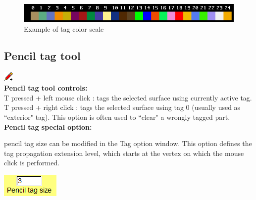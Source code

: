 \begin{figure}
  \centering
  \includegraphics[scale=0.5]{images/Tags/Tag_color_scale.png} 
	\caption{Example of tag color scale}
\label{tag_color_scale}
 
\end{figure}



\subsection{Pencil tag tool}
\includegraphics[scale=0.7]{images/pixmap/pencil.png}\\
\textbf{Pencil tag tool controls:}\\
T pressed + left mouse click : tags the selected surface using currently active tag.\\
T pressed + right click : tags the selected surface using tag 0 (usually used as ``exterior" tag). This option is often used to ``clear" a wrongly tagged part.\\
\textbf{Pencil tag special option:}\\
\noindent
\begin{minipage}{0.6\textwidth}
pencil tag size can be modified in the Tag option window. This
option defines the tag propagation extension level, which starts at
the vertex on which the mouse click is performed.
\end{minipage}    
\begin{minipage}{0.4\textwidth}\centering
  \includegraphics[scale=0.5]{images/Tags/Pencil_tag_size.png}
 \end{minipage} 
\noindent



